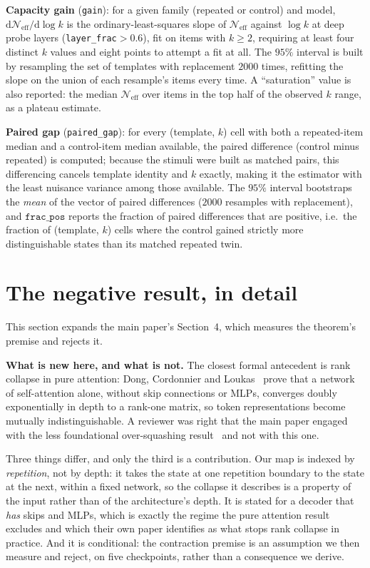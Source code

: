 \documentclass[11pt]{article}
\begin{document}
\textbf{Capacity gain} (\texttt{gain}): for a given family (repeated or
control) and model, $\mathrm{d}\mathcal{N}_{\mathrm{eff}}/\mathrm{d}\log k$ is
the ordinary-least-squares slope of $\mathcal{N}_{\mathrm{eff}}$ against
$\log k$ at deep probe layers (\texttt{layer\_frac}$>0.6$), fit on items with
$k\ge2$, requiring at least four distinct $k$ values and eight points to
attempt a fit at all. The $95\%$ interval is built by resampling the set of
templates with replacement $2000$ times, refitting the slope on the union of
each resample's items every time. A ``saturation'' value is also reported: the
median $\mathcal{N}_{\mathrm{eff}}$ over items in the top half of the
observed $k$ range, as a plateau estimate.

\textbf{Paired gap} (\texttt{paired\_gap}): for every (template, $k$) cell
with both a repeated-item median and a control-item median available, the
paired difference (control minus repeated) is computed; because the stimuli
were built as matched pairs, this differencing cancels template identity and
$k$ exactly, making it the estimator with the least nuisance variance among
those available. The $95\%$ interval bootstraps the \emph{mean} of the vector
of paired differences ($2000$ resamples with replacement), and
$\texttt{frac\_pos}$ reports the fraction of paired differences that are
positive, i.e.\ the fraction of (template, $k$) cells where the control
gained strictly more distinguishable states than its matched repeated twin.

\section{The negative result, in detail}
\label{sec:s5}

This section expands the main paper's Section~4, which measures the theorem's
premise and rejects it.

\textbf{What is new here, and what is not.} The closest formal antecedent is
rank collapse in pure attention: Dong, Cordonnier and
Loukas~\cite{dong2021attention} prove that a network of self-attention alone,
without skip connections or MLPs, converges doubly exponentially in depth to a
rank-one matrix, so token representations become mutually indistinguishable. A
reviewer was right that the main paper engaged with the less foundational
over-squashing result~\cite{barbero2024glasses} and not with this one.

Three things differ, and only the third is a contribution. Our map is indexed by
\emph{repetition}, not by depth: it takes the state at one repetition boundary to
the state at the next, within a fixed network, so the collapse it describes is a
property of the input rather than of the architecture's depth. It is stated for
a decoder that \emph{has} skips and MLPs, which is exactly the regime the pure
attention result excludes and which their own paper identifies as what stops
rank collapse in practice. And it is conditional: the contraction premise is an
assumption we then measure and reject, on five checkpoints, rather than a
consequence we derive.
\end{document}
